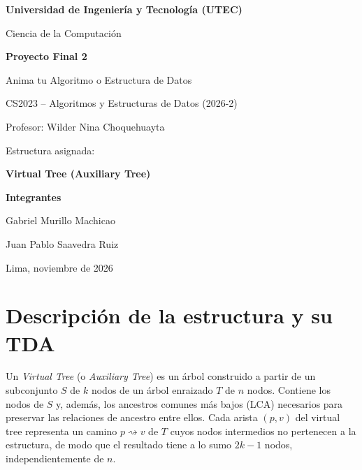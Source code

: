 \documentclass[11pt,a4paper]{article}
\theoremstyle{plain}
\newcommand{\IntegranteA}{Gabriel Murillo Machicao}
\newcommand{\IntegranteB}{Juan Pablo Saavedra Ruiz}
\begin{document}
\begin{titlepage}
  \centering
  \vspace*{2cm}
  {\Large \textbf{Universidad de Ingeniería y Tecnología (UTEC)}\par}
  {\large Ciencia de la Computación\par}
  \vspace{2cm}
  {\Huge \textbf{Proyecto Final 2}\par}
  \vspace{0.4cm}
  {\Large Anima tu Algoritmo o Estructura de Datos\par}
  \vspace{1.5cm}
  {\large CS2023 -- Algoritmos y Estructuras de Datos (2026-2)\par}
  {\large Profesor: Wilder Nina Choquehuayta\par}
  \vspace{2cm}
  {\Large Estructura asignada:\par}
  {\Huge \textbf{Virtual Tree (Auxiliary Tree)}\par}
  \vspace{2cm}
  {\large \textbf{Integrantes}\par}
  \vspace{0.3cm}
  {\large \IntegranteA\par}
  {\large \IntegranteB\par}
  \vfill
  {\large Lima, noviembre de 2026\par}
\end{titlepage}

\tableofcontents
\newpage

\section{Descripción de la estructura y su TDA}

Un \emph{Virtual Tree} (o \emph{Auxiliary Tree}) es un árbol construido a partir de un
subconjunto $S$ de $k$ nodos de un árbol enraizado $T$ de $n$ nodos. Contiene los nodos de
$S$ y, además, los ancestros comunes más bajos (LCA) necesarios para preservar las relaciones
de ancestro entre ellos. Cada arista $(p, v)$ del virtual tree representa un camino
$p \rightsquigarrow v$ de $T$ cuyos nodos intermedios no pertenecen a la estructura, de modo
que el resultado tiene a lo sumo $2k-1$ nodos, independientemente de $n$.
\end{document}
